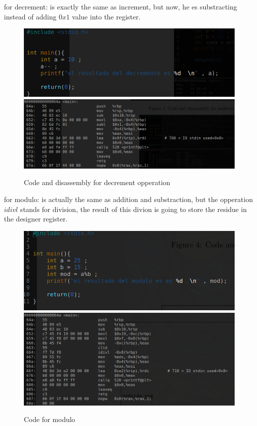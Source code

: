 \documentclass[10pt,a4paper]{article} %
\begin{document}
        \newpage
        for decrement:
        is exactly the same as increment, but now, he es substracting instead
        of adding $ 0x1  $ value into the register.
        \begin{figure}[h!]
            \centering
            \includegraphics[width=1.0\linewidth]{deccode.png}
            \includegraphics[width=1.0\linewidth]{decdis.png}
            \caption{Code and disassembly for decrement opperation}
            \label{figdec}
        \end{figure}

        \newpage
        for modulo:
        is actually the same as addition and substraction, but the opperation $
        idivl  $ stands for division, the result of this divion is going to
        store the residue in the designer register.
        \begin{figure}[h!]
            \centering
            \includegraphics[width=1.0\linewidth]{modcode.png}
            \includegraphics[width=1.0\linewidth]{moddis.png}
            \caption{Code for modulo}
            \label{figmode}
        \end{figure}
\end{document}
